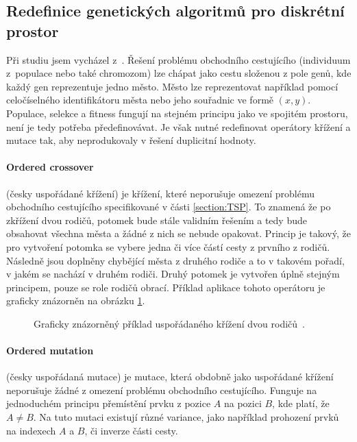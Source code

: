 \subsection{Redefinice genetických algoritmů pro diskrétní prostor}
Při studiu jsem vycházel z~\cite{GA_TSP, orderedCrossover}. Řešení problému obchodního cestujícího (individuum z~populace nebo také chromozom) lze chápat jako cestu složenou z pole genů, kde každý gen reprezentuje jedno město. Město lze reprezentovat například pomocí celočíselného identifikátoru města nebo jeho souřadnic ve formě $(x, y)$. Populace, selekce a fitness fungují na stejném principu jako ve spojitém prostoru, není je tedy potřeba předefinovávat. Je však nutné redefinovat operátory křížení a mutace tak, aby neprodukovaly v řešení duplicitní hodnoty.

\paragraph{Ordered crossover} (česky uspořádané křížení) je křížení, které neporušuje omezení problému obchodního cestujícího specifikované v části \ref{section:TSP}. To znamená že po zkřížení dvou rodičů, potomek bude stále validním řešením a tedy bude obsahovat všechna města a žádné z nich se nebude opakovat. Princip je takový, že pro vytvoření potomka se vybere jedna či více částí cesty z prvního z rodičů. Následně jsou doplněny chybějící města z druhého rodiče a to v takovém pořadí, v jakém se nachází v druhém rodiči. Druhý potomek je vytvořen úplně stejným principem, pouze se role rodičů obrací. Příklad aplikace tohoto operátoru je graficky znázorněn na obrázku \ref{fig:orderedCrossover}.

\begin{figure}[t]
    \centering
    \caption{Graficky znázorněný příklad uspořádaného křížení dvou rodičů~\cite{orderedCrossover}.}
    \label{fig:orderedCrossover}
\end{figure}

\paragraph{Ordered mutation} (česky uspořádaná mutace) je mutace, která obdobně jako uspořádané křížení neporušuje žádné z omezení problému obchodního cestujícího. Funguje na jednoduchém principu přemístění prvku z pozice $A$ na pozici $B$, kde platí, že $A \neq B$. Na tuto mutaci existují různé variance, jako například prohození prvků na indexech $A$ a $B$, či inverze části cesty.


